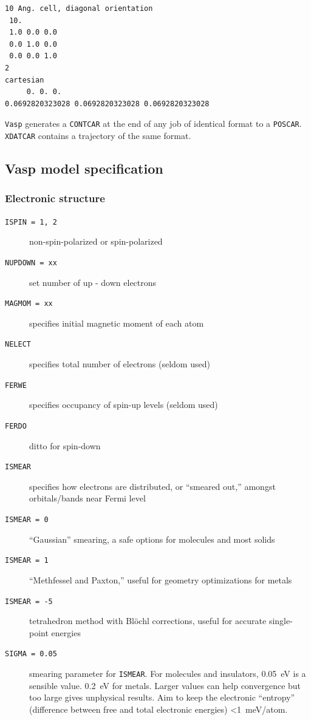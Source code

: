 \documentclass[11pt]{article}
\begin{document}
\begin{verbatim}
10 Ang. cell, diagonal orientation
 10.
 1.0 0.0 0.0
 0.0 1.0 0.0
 0.0 0.0 1.0
2
cartesian
     0. 0. 0.
0.0692820323028 0.0692820323028 0.0692820323028  
\end{verbatim}

\texttt{Vasp} generates a \texttt{CONTCAR} at the end of any job of identical format to a \texttt{POSCAR}. \texttt{XDATCAR} contains a trajectory of the same format.
\subsection{Vasp model specification}
\label{sec:orgca8b31e}
\subsubsection{Electronic structure}
\label{sec:orgfade9d8}
\begin{description}
\item[{\texttt{ISPIN = 1, 2}}] non-spin-polarized or spin-polarized
\item[{\texttt{NUPDOWN = xx}}] set number of up - down electrons
\item[{\texttt{MAGMOM = xx}}] specifies initial magnetic moment of each atom
\item[{\texttt{NELECT}}] specifies total number of electrons (seldom used)
\item[{\texttt{FERWE}}] specifies occupancy of spin-up levels (seldom used)
\item[{\texttt{FERDO}}] ditto for spin-down
\item[{\texttt{ISMEAR}}] specifies how electrons are distributed, or ``smeared out,'' amongst orbitals/bands near Fermi level
\item[{\texttt{ISMEAR = 0}}] ``Gaussian'' smearing, a safe options for molecules and most solids
\item[{\texttt{ISMEAR = 1}}] ``Methfessel and Paxton,'' useful for geometry optimizations for metals
\item[{\texttt{ISMEAR = -5}}] tetrahedron method with Bl\"{o}chl corrections, useful for accurate single-point energies
\item[{\texttt{SIGMA = 0.05}}] smearing parameter for \texttt{ISMEAR}.  For molecules and insulators, \SI{0.05}{eV} is a sensible value. \SI{0.2}{eV} for metals. Larger values can help convergence but too large gives unphysical results. Aim to keep the electronic ``entropy'' (difference between free and total electronic energies) \SI{<1}{meV/atom}.
\end{description}
\end{document}
